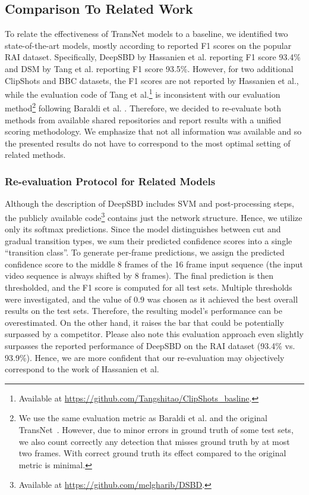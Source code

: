 \documentclass[sigconf]{acmart}
\begin{document}
\subsection{Comparison To Related Work}
To relate the effectiveness of TransNet models to a baseline, we identified two state-of-the-art models, mostly according to reported F1 scores on the popular RAI dataset. Specifically, DeepSBD by Hassanien et al. \cite{HassanienESHM17} reporting F1 score 93.4\% and DSM by Tang et al. \cite{Tang2018clipshots} reporting F1 score 93.5\%. However, for two additional ClipShots and BBC datasets, the F1 scores are not reported by Hassanien et al., while the evaluation code of Tang et al.\footnote{\label{note:1}Available at \url{https://github.com/Tangshitao/ClipShots_basline}.} is inconsistent with our evaluation method\footnote{We use the same evaluation metric as Baraldi et al. \cite{Baraldi15RAI} and the original TransNet~\cite{transnet}. However, due to minor errors in ground truth of some test sets, we also count correctly any detection that misses ground truth by at most two frames. With correct ground truth its effect compared to the original metric is minimal.\label{fn:metric}} following Baraldi et al. \cite{Baraldi15RAI}.
Therefore, we decided to re-evaluate both methods from available shared repositories and report results with a unified scoring methodology. We  emphasize that not all information was available and so the presented results do not have to correspond to the most optimal setting of related methods.

\subsubsection{Re-evaluation Protocol for Related Models}\label{sec:reeval_protocol}
Although the description of DeepSBD includes SVM and post-processing steps, the publicly available code\footnote{Available at \url{https://github.com/melgharib/DSBD}.} contains just the network structure. Hence, we utilize only its softmax predictions.
Since the model distinguishes between cut and gradual transition types, we sum their predicted confidence scores into a single ``transition class''.
To generate per-frame predictions, we assign the predicted confidence score to the middle 8 frames of the 16 frame input sequence (the input video sequence is always shifted by 8 frames). The final prediction is then thresholded, and the F1 score is computed for all test sets. Multiple thresholds were investigated, and the value of $0.9$ was chosen as it achieved the best overall results on the test sets. Therefore, the resulting model's performance can be overestimated. On the other hand, it raises the bar that could be potentially surpassed by a competitor. Please also note this evaluation approach even slightly surpasses the reported performance of DeepSBD on the RAI dataset (93.4\% vs. 93.9\%). Hence, we are more confident that our re-evaluation may objectively correspond to the work of Hassanien et al.
\end{document}
